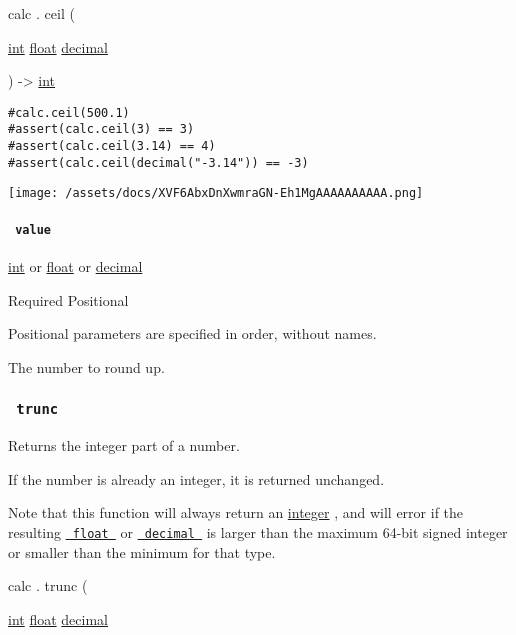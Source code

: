 calc { . } { ceil } (

{ \href{/docs/reference/foundations/int/}{int}
\href{/docs/reference/foundations/float/}{float}
\href{/docs/reference/foundations/decimal/}{decimal} }

) -\textgreater{} \href{/docs/reference/foundations/int/}{int}

\begin{verbatim}
#calc.ceil(500.1)
#assert(calc.ceil(3) == 3)
#assert(calc.ceil(3.14) == 4)
#assert(calc.ceil(decimal("-3.14")) == -3)
\end{verbatim}

\texttt{[image: /assets/docs/XVF6AbxDnXwmraGN-Eh1MgAAAAAAAAAA.png]}

\paragraph{\texorpdfstring{\texttt{\ value\ }}{ value }}\label{functions-ceil-value}

\href{/docs/reference/foundations/int/}{int} {or}
\href{/docs/reference/foundations/float/}{float} {or}
\href{/docs/reference/foundations/decimal/}{decimal}

{Required} {{ Positional }}

\label{functions-ceil-value-positional-tooltip}
Positional parameters are specified in order, without names.

The number to round up.

\subsubsection{\texorpdfstring{\texttt{\ trunc\ }}{ trunc }}\label{functions-trunc}

Returns the integer part of a number.

If the number is already an integer, it is returned unchanged.

Note that this function will always return an
\href{/docs/reference/foundations/int/}{integer} , and will error if the
resulting \href{/docs/reference/foundations/float/}{\texttt{\ float\ }}
or \href{/docs/reference/foundations/decimal/}{\texttt{\ decimal\ }} is
larger than the maximum 64-bit signed integer or smaller than the
minimum for that type.

calc { . } { trunc } (

{ \href{/docs/reference/foundations/int/}{int}
\href{/docs/reference/foundations/float/}{float}
\href{/docs/reference/foundations/decimal/}{decimal} }


